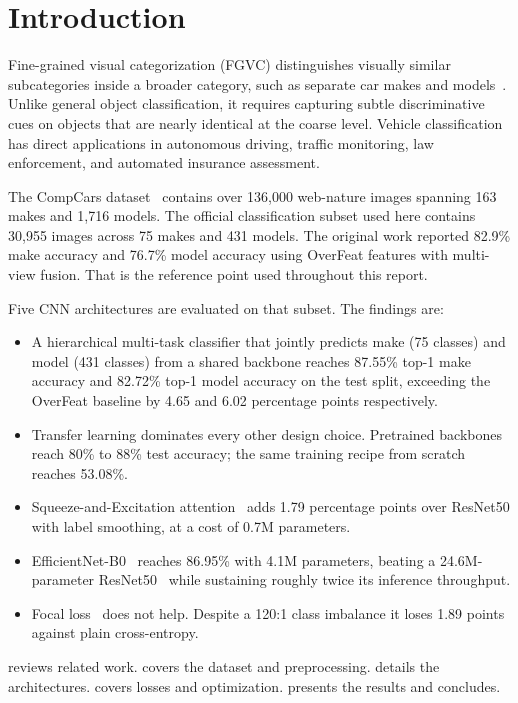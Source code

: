 
\section{Introduction}
\label{sec:introduction}

Fine-grained visual categorization (FGVC) distinguishes visually similar subcategories inside a broader category, such as separate car makes and models~\cite{Yang2015}. Unlike general object classification, it requires capturing subtle discriminative cues on objects that are nearly identical at the coarse level. Vehicle classification has direct applications in autonomous driving, traffic monitoring, law enforcement, and automated insurance assessment.

The CompCars dataset~\cite{Yang2015} contains over 136,000 web-nature images spanning 163 makes and 1,716 models. The official classification subset used here contains 30,955 images across 75 makes and 431 models. The original work reported 82.9\% make accuracy and 76.7\% model accuracy using OverFeat features with multi-view fusion. That is the reference point used throughout this report.

Five CNN architectures are evaluated on that subset. The findings are:

\begin{itemize}
    \item A hierarchical multi-task classifier that jointly predicts make (75 classes) and model (431 classes) from a shared backbone reaches 87.55\% top-1 make accuracy and 82.72\% top-1 model accuracy on the test split, exceeding the OverFeat baseline by 4.65 and 6.02 percentage points respectively.
    \item Transfer learning dominates every other design choice. Pretrained backbones reach 80\% to 88\% test accuracy; the same training recipe from scratch reaches 53.08\%.
    \item Squeeze-and-Excitation attention~\cite{Hu2018} adds 1.79 percentage points over ResNet50 with label smoothing, at a cost of 0.7M parameters.
    \item EfficientNet-B0~\cite{Tan2019} reaches 86.95\% with 4.1M parameters, beating a 24.6M-parameter ResNet50~\cite{He2016} while sustaining roughly twice its inference throughput.
    \item Focal loss~\cite{Lin2017} does not help. Despite a 120:1 class imbalance it loses 1.89 points against plain cross-entropy.
\end{itemize}

 reviews related work.  covers the dataset and preprocessing.  details the architectures.  covers losses and optimization.  presents the results and  concludes.
